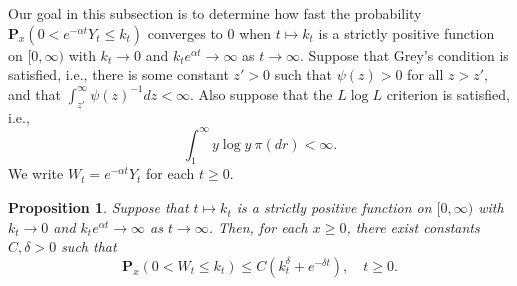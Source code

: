 \documentclass[12pt,a4paper]{amsart}
\theoremstyle{plain}
\newtheorem{prop}[thm]{Proposition}
\theoremstyle{definition}
\numberwithin{equation}{section}
\begin{document}
    Our goal in this subsection is to determine how fast the probability $\mathbf P_x(0<e^{-\alpha t}Y_t \leq k_t)$ converges to $0$ 
    when $t\mapsto k_t$ is a strictly positive function on $[0,\infty)$ with $k_t \to 0$ and $k_t e^{\alpha t} \to \infty$ as $t\to \infty$.
    Suppose that Grey's condition is satisfied, i.e., there is some constant $z' > 0$ such that $\psi(z) > 0$ for all $z>z'$, and that $\int_{z'}^\infty \psi(z)^{-1}dz < \infty$.
    Also suppose that the $L \log L$ criterion is satisfied, i.e.,
\[
    \int_1^\infty y \log y~\pi(dr)
    < \infty.
\]
    We write $W_t = e^{-\alpha t}Y_t$ for each $t\geq 0$.
\begin{prop}
\label{lem: control of XT}
    Suppose that $t\mapsto k_t$ is a strictly positive function on $[0,\infty)$ with $k_t \to 0$ and $k_t e^{\alpha t} \to \infty$ as $t\to \infty$.
    Then, for each $x\geq 0$, there exist constants $C,\delta>0$ such that
\[
    \mathbf P_x(0<W_t\leq k_t)
    \leq C(k_t^\delta + e^{-\delta t}), \quad t\geq 0.
\]
\end{prop}
\end{document}
